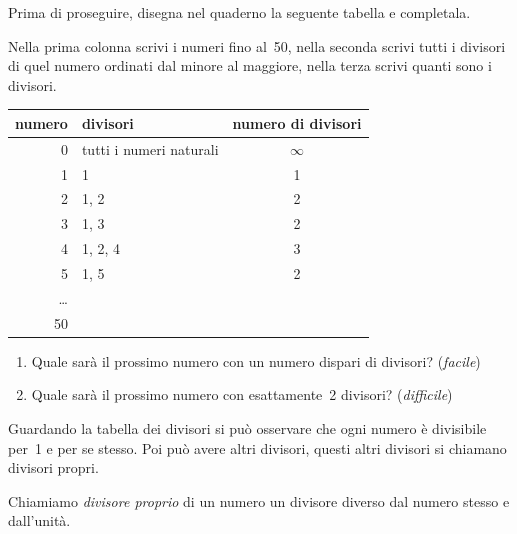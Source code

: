 Prima di proseguire, disegna nel quaderno la seguente tabella e completala. 

Nella prima colonna scrivi i numeri fino al~50, nella seconda scrivi tutti 
i divisori di quel numero ordinati dal minore al maggiore, nella terza 
scrivi quanti sono i divisori.

\begin{table}[h]
\centering
\begin{tabular}{|r|p{6cm}|c|}
\hline
\textsf{\relax 
numero
} & \textsf{\relax 
          divisori 
} & \textsf{\relax 
numero di divisori
}\\
\hline
0 & tutti i numeri naturali & \(\infty\)\\
\hline
1 & 1 & 1\\
\hline
2 & 1, 2 & 2\\
\hline
3 & 1, 3 & 2\\
\hline
4 & 1, 2, 4 & 3\\
\hline
5 & 1, 5 & 2\\
\hline
\dots &  & \\
\hline
50 &  & \\
\hline
\end{tabular}
\end{table}

\begin{enumerate}[noitemsep, label=(\alph*)]
\item Quale sarà il prossimo numero con un numero dispari 
di divisori? (\emph{facile})
\item Quale sarà il prossimo numero con esattamente~2
divisori? (\emph{difficile})
\end{enumerate}

Guardando la tabella dei divisori si può osservare che ogni numero è 
divisibile per~1 e per se stesso. Poi può avere altri divisori, questi
altri divisori si chiamano divisori propri.

\begin{definizione}{}{}
Chiamiamo \emph{divisore proprio} di un numero un divisore diverso dal 
numero stesso e dall'unità.
\end{definizione}

